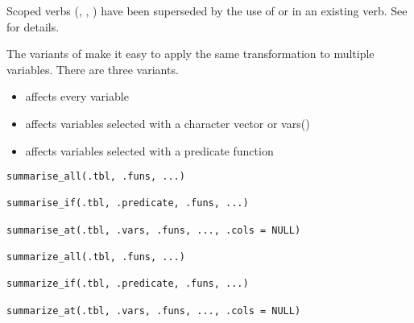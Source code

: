 \documentclass[a4paper]{book}
\begin{document}
%
\begin{Description}
\strong{[Superseded]}

Scoped verbs (, , ) have been superseded by the use of
 or  in an existing verb. See  for
details.

The  variants of  make it easy to apply the same
transformation to multiple variables.
There are three variants.
\begin{itemize}

\item{}  affects every variable
\item{}  affects variables selected with a character vector or
vars()
\item{}  affects variables selected with a predicate function

\end{itemize}

\end{Description}
%
\begin{Usage}
\begin{verbatim}
summarise_all(.tbl, .funs, ...)

summarise_if(.tbl, .predicate, .funs, ...)

summarise_at(.tbl, .vars, .funs, ..., .cols = NULL)

summarize_all(.tbl, .funs, ...)

summarize_if(.tbl, .predicate, .funs, ...)

summarize_at(.tbl, .vars, .funs, ..., .cols = NULL)
\end{verbatim}
\end{Usage}
%
\end{document}
